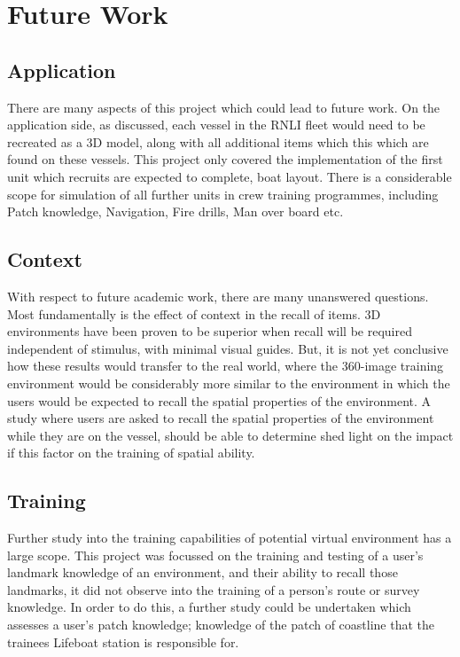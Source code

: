 \documentclass[a4paper, openright, twoside]{book}
\begin{document}
\section{Future Work}\label{further}
\subsection{Application}
There are many aspects of this project which could lead to future work. On the application side, as discussed, each vessel in the RNLI fleet would need to be recreated as a 3D model, along with all additional items which this which are found on these vessels. This project only covered the implementation of the first unit which recruits are expected to complete, boat layout. There is a considerable scope for simulation of all further units in crew training programmes, including Patch knowledge, Navigation, Fire drills, Man over board etc. 

\subsection{Context}
With respect to future academic work, there are many unanswered questions. Most fundamentally is the effect of context in the recall of items. 3D environments have been proven to be superior when recall will be required independent of stimulus, with minimal visual guides. But, it is not yet conclusive how these results would transfer to the real world, where the 360-image training environment would be considerably more similar to the environment in which the users would be expected to recall the spatial properties of the environment. A study where users are asked to recall the spatial properties of the environment while they are on the vessel, should be able to determine shed light on the impact if this factor on the training of spatial ability. 

\subsection{Training}
Further study into the training capabilities of potential virtual environment has a large scope. This project was focussed on the training and testing of a user's landmark knowledge of an environment, and their ability to recall those landmarks, it did not observe into the training of a person's route or survey knowledge. In order to do this, a further study could be undertaken which assesses a user's patch knowledge; knowledge of the patch of coastline that the trainees Lifeboat station is responsible for.
\end{document}
